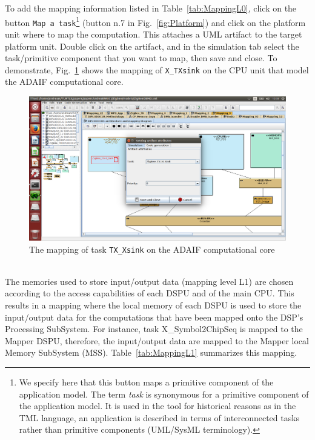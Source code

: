 \documentclass{llncs}
\newcommand{\screenshotsize}{1.0\textwidth}
\begin{document}
%
To add the mapping information listed in Table~\ref{tab:MappingL0}, click on the button \texttt{Map a task}\footnote{We
specify here that this button maps a primitive component of the application model. The term \textit{task} is synonymous for a
primitive component of the application model. It is used in the tool for historical reasons as in the TML language, an
application is described in terms of interconnected tasks rather than primitive components (UML/SysML terminology).}
(button n.7 in Fig.~\ref{fig:Platform}) and click on the platform unit where to map the computation. This attaches a UML
artifact to the target platform unit. Double click on the artifact, and in the simulation tab select the task/primitive
component that you want to map, then save and close. To demonstrate, Fig.~\ref{fig:MapSink} shows the mapping of
\texttt{X\_TXsink} on the CPU unit that model the ADAIF computational core.
%
\begin{figure}[htbp]
	\centering
	\includegraphics[width=\screenshotsize]{figures/screenshot/MapSink.png}
	\caption{The mapping of task \texttt{TX\_Xsink} on the ADAIF computational core}
	\label{fig:MapSink}
\end{figure}
%
\\The memories used to store input/output data (mapping level L1) are chosen according to the access capabilities of
each DSPU and of the main CPU. This results in a mapping where the local memory of each DSPU is used to store the
input/output data for the computations that have been mapped onto the DSP's Processing SubSystem. For instance, task
X\_Symbol2ChipSeq is mapped to the Mapper DSPU, therefore, the input/output data are mapped to the Mapper local Memory
SubSystem (MSS). Table~\ref{tab:MappingL1} summarizes this mapping.
%
\end{document}
